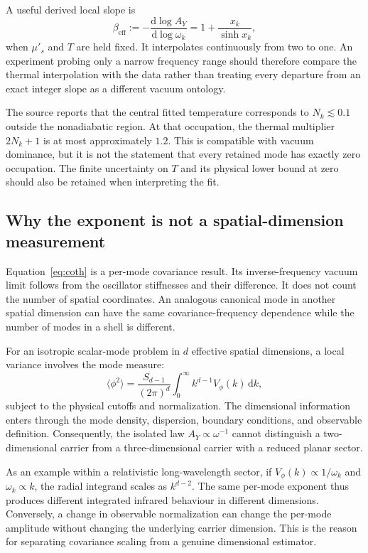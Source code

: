 \documentclass[11pt,a4paper]{article}
\theoremstyle{definition}
\theoremstyle{remark}
\newcommand{\dd}{\mathrm{d}}
\newcommand{\musp}{\mu'_s}
\begin{document}
A useful derived local slope is
\begin{equation}
 \beta_{\mathrm{eff}}
 :=-\frac{\dd\log A_Y}{\dd\log\omega_k}
 =1+\frac{x_k}{\sinh x_k},
 \label{eq:slope}
\end{equation}
when $\musp$ and $T$ are held fixed. It interpolates continuously from two to one. An experiment probing only a narrow frequency range should therefore compare the thermal interpolation with the data rather than treating every departure from an exact integer slope as a different vacuum ontology.

The source reports that the central fitted temperature corresponds to $N_k\lesssim0.1$ outside the nonadiabatic region. At that occupation, the thermal multiplier $2N_k+1$ is at most approximately $1.2$. This is compatible with vacuum dominance, but it is not the statement that every retained mode has exactly zero occupation. The finite uncertainty on $T$ and its physical lower bound at zero should also be retained when interpreting the fit.\cite{zhang2026}

\subsection{Why the exponent is not a spatial-dimension measurement}
Equation~\eqref{eq:coth} is a per-mode covariance result. Its inverse-frequency vacuum limit follows from the oscillator stiffnesses and their difference. It does not count the number of spatial coordinates. An analogous canonical mode in another spatial dimension can have the same covariance-frequency dependence while the number of modes in a shell is different.

For an isotropic scalar-mode problem in $d$ effective spatial dimensions, a local variance involves the mode measure:
\begin{equation}
 \langle\phi^2\rangle
 =\frac{S_{d-1}}{(2\pi)^d}
   \int_0^\infty k^{d-1}V_\phi(k)\,\dd k,
 \label{eq:mode_measure}
\end{equation}
subject to the physical cutoffs and normalization. The dimensional information enters through the mode density, dispersion, boundary conditions, and observable definition. Consequently, the isolated law $A_Y\propto\omega^{-1}$ cannot distinguish a two-dimensional carrier from a three-dimensional carrier with a reduced planar sector.

As an example within a relativistic long-wavelength sector, if $V_\phi(k)\propto1/\omega_k$ and $\omega_k\propto k$, the radial integrand scales as $k^{d-2}$. The same per-mode exponent thus produces different integrated infrared behaviour in different dimensions. Conversely, a change in observable normalization can change the per-mode amplitude without changing the underlying carrier dimension. This is the reason for separating covariance scaling from a genuine dimensional estimator.
\end{document}
